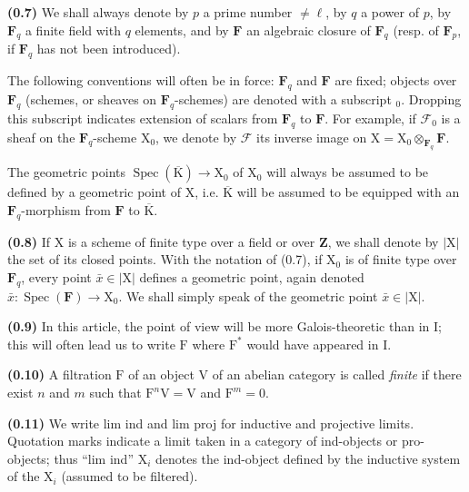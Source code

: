 \documentclass[11pt,leqno]{article}
\begin{document}
\textbf{(0.7)} We shall always denote by \(p\) a prime number \(\ne\ell\), by \(q\) a power of \(p\), by \(\mathbf{F}_q\) a finite field with \(q\) elements, and by \(\mathbf{F}\) an algebraic closure of \(\mathbf{F}_q\) (resp. of \(\mathbf{F}_p\), if \(\mathbf{F}_q\) has not been introduced).

The following conventions will often be in force: \(\mathbf{F}_q\) and \(\mathbf{F}\) are fixed; objects over \(\mathbf{F}_q\) (schemes, or sheaves on \(\mathbf{F}_q\)-schemes) are denoted with a subscript \({}_0\). Dropping this subscript indicates extension of scalars from \(\mathbf{F}_q\) to \(\mathbf{F}\). For example, if \(\mathscr{F}_0\) is a sheaf on the \(\mathbf{F}_q\)-scheme \(\mathrm{X}_0\), we denote by \(\mathscr{F}\) its inverse image on \(\mathrm{X}=\mathrm{X}_0\otimes_{\mathbf{F}_q}\mathbf{F}\).

The geometric points \(\operatorname{Spec}(\overline{\mathrm{K}})\to\mathrm{X}_0\) of \(\mathrm{X}_0\) will always be assumed to be defined by a geometric point of \(\mathrm{X}\), i.e. \(\overline{\mathrm{K}}\) will be assumed to be equipped with an \(\mathbf{F}_q\)-morphism from \(\mathbf{F}\) to \(\overline{\mathrm{K}}\).

\textbf{(0.8)} If \(\mathrm{X}\) is a scheme of finite type over a field or over \(\mathbf{Z}\), we shall denote by \(|\mathrm{X}|\) the set of its closed points. With the notation of (0.7), if \(\mathrm{X}_0\) is of finite type over \(\mathbf{F}_q\), every point \(\bar x\in|\mathrm{X}|\) defines a geometric point, again denoted \(\bar x:\operatorname{Spec}(\mathbf{F})\to\mathrm{X}_0\). We shall simply speak of the geometric point \(\bar x\in|\mathrm{X}|\).

\textbf{(0.9)} In this article, the point of view will be more Galois-theoretic than in I; this will often lead us to write \(\mathrm{F}\) where \(\mathrm{F}^{*}\) would have appeared in I.

\textbf{(0.10)} A filtration \(\mathrm{F}\) of an object \(\mathrm{V}\) of an abelian category is called \textit{finite} if there exist \(n\) and \(m\) such that \(\mathrm{F}^n\mathrm{V}=\mathrm{V}\) and \(\mathrm{F}^m=0\).

\textbf{(0.11)} We write lim ind and lim proj for inductive and projective limits. Quotation marks indicate a limit taken in a category of ind-objects or pro-objects; thus “lim ind” \(\mathrm{X}_i\) denotes the ind-object defined by the inductive system of the \(\mathrm{X}_i\) (assumed to be filtered).
\end{document}
